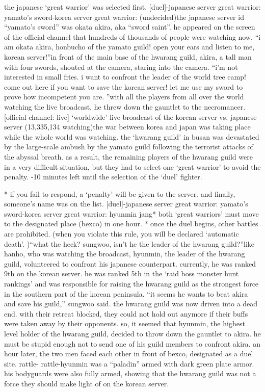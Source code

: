  the japanese ‘great warrior’ was selected first.
[duel]-japanese server great warrior: yamato’s sword-korea server great warrior: (undecided)the japanese server id “yamato’s sword” was okata akira, aka “sword saint”.
he appeared on the screen of the official channel that hundreds of thousands of people were watching now.
“i am okata akira, honbucho of the yamato guild! open your ears and listen to me, korean server!”in front of the main base of the hwarang guild, akira, a tall man with four swords, shouted at the camera, staring into the camera.
“i’m not interested in small fries.
 i want to confront the leader of the world tree camp! come out here if you want to save the korean server! let me use my sword to prove how incompetent you are.
”with all the players from all over the world watching the live broadcast, he threw down the gauntlet to the necromancer.
[official channel: live] ‘worldwide’ live broadcast of the korean server vs.
 japanese server (13,335,134 watching)the war between korea and japan was taking place while the whole world was watching.
the ‘hwarang guild’ in busan was devastated by the large-scale ambush by the yamato guild following the terrorist attacks of the abyssal breath.
as a result, the remaining players of the hwarang guild were in a very difficult situation, but they had to select one ‘great warrior’ to avoid the penalty.
-10 minutes left until the selection of the ‘duel’ fighter.


* if you fail to respond, a ‘penalty’ will be given to the server.
and finally, someone’s name was on the list.
[duel]-japanese server great warrior: yamato’s sword-korea server great warrior: hyunmin jang* both ‘great warriors’ must move to the designated place (bexco) in one hour.
* once the duel begins, other battles are prohibited.
 (when you violate this rule, you will be declared ‘automatic death’.
)“what the heck? sungwoo, isn’t he the leader of the hwarang guild?”like hanho, who was watching the broadcast, hyunmin, the leader of the hwarang guild, volunteered to confront his japanese counterpart.
currently, he was ranked 9th on the korean server.
 he was ranked 5th in the ‘raid boss monster hunt rankings’ and was responsible for raising the hwarang guild as the strongest force in the southern part of the korean peninsula.
“it seems he wants to beat akira and save his guild,” sungwoo said.
the hwarang guild was now driven into a dead end.
 with their retreat blocked, they could not hold out anymore if their buffs were taken away by their opponents.
so, it seemed that hyunmin, the highest level holder of the hwarang guild, decided to throw down the gauntlet to akira.
he must be stupid enough not to send one of his guild members to confront akira.
an hour later, the two men faced each other in front of bexco, designated as a duel site.
rattle- rattle-hyunmin was a “paladin” armed with dark green plate armor.
 his bodyguards were also fully armed, showing that the hwarang guild was not a force they should make light of on the korean server.


 